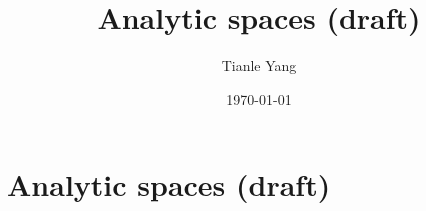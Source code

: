 \documentclass{noteformyself}
\title{Analytic spaces (draft)}
\author{Tianle Yang}
\date{\today}
\begin{document}
    \maketitle

    \section{Analytic spaces (draft)}



\end{document}

